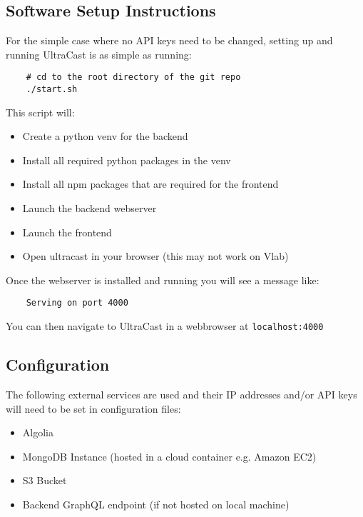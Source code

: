 \documentclass[../report.tex]{subfiles}
\begin{document}
   

\subsection{Software Setup Instructions}

For the simple case where no API keys need to be changed, setting up and running UltraCast is as simple as running:

\begin{verbatim}
    # cd to the root directory of the git repo
    ./start.sh
\end{verbatim}
%
This script will: 
\begin{itemize}
    \item Create a python venv for the backend
    \item Install all required python packages in the venv
    \item Install all npm packages that are required for the frontend
    \item Launch the backend webserver
    \item Launch the frontend
    \item Open ultracast in your browser (this may not work on Vlab)
\end{itemize}

Once the webserver is installed and running you will see a message like:

\begin{verbatim}
    Serving on port 4000
\end{verbatim}

You can then navigate to UltraCast in a webbrowser at \verb|localhost:4000|


\subsection{Configuration}

The following external services are used and their IP addresses and/or API keys will need to be set in configuration files:

\begin{itemize}
    \item Algolia
    \item MongoDB Instance (hosted in a cloud container e.g. Amazon EC2)
    \item S3 Bucket
    \item Backend GraphQL endpoint (if not hosted on local machine)
\end{itemize}
\end{document}
